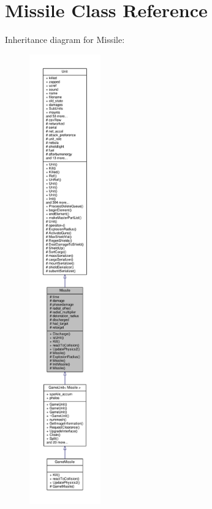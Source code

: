 \hypertarget{classMissile}{}\section{Missile Class Reference}
\label{classMissile}


Inheritance diagram for Missile\+:
\nopagebreak
\begin{figure}[H]
\begin{center}
\leavevmode
\includegraphics[height=550pt]{dd/d12/classMissile__inherit__graph}
\end{center}
\end{figure}


